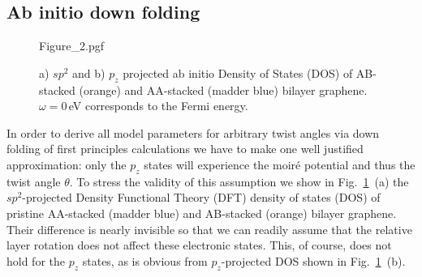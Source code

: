 \subsection{Ab initio down folding}
    
\begin{figure}
    \centering
    {Figure_2.pgf}
    \caption{a) $sp^2$ and b) $p_z$ projected ab initio Density of States (DOS) of AB-stacked (orange) and AA-stacked (madder blue) bilayer graphene. $\omega=0\,$eV corresponds to the Fermi energy.}
    \label{fig:mat22:ab} 
\end{figure}
    
In order to derive all model parameters for arbitrary twist angles via down folding of first principles calculations we have to make one well justified approximation: only the $p_z$ states will experience the moir\'e potential and thus the twist angle $\theta$.  To stress the validity of this assumption we show in Fig.~\ref{fig:mat22:ab}~(a) the $sp^2$-projected Density Functional Theory (DFT) density of states (DOS) of pristine AA-stacked (madder blue) and AB-stacked (orange) bilayer graphene.  Their difference is nearly invisible so that we can readily assume that the relative layer rotation does not affect these electronic states.  This, of course, does not hold for the $p_z$ states, as is obvious from $p_z$-projected DOS shown in Fig.~\ref{fig:mat22:ab}~(b).
            
